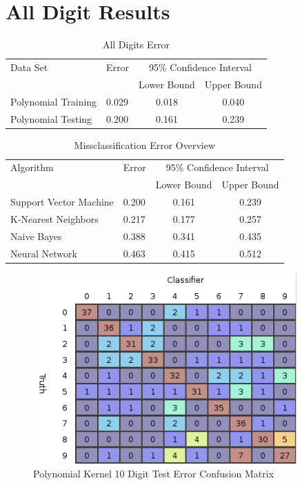 \documentclass{article}
\begin{document}
\section{All Digit Results}\label{ResultsAll}

\begin{table}
\caption{All Digits Error}
\begin{center}
\begin{tabular}{llcc}
\toprule
Data Set & Error & \multicolumn{2}{c}{95\% Confidence Interval} \\
\cmidrule(r){3-4}
& & Lower Bound & Upper Bound \\
\midrule
Polynomial Training & 0.029 & 0.018 & 0.040 \\
Polynomial Testing & 0.200 & 0.161 & 0.239 \\
\bottomrule
\end{tabular}
\label{error2}
\end{center}
\end{table}


\begin{table}
\caption{Missclassification Error Overview}
\begin{center}
\begin{tabular}{llcc}
\toprule
Algorithm & Error & \multicolumn{2}{c}{95\% Confidence Interval} \\
\cmidrule(r){3-4}
& & Lower Bound & Upper Bound \\
\midrule
Support Vector Machine & 0.200 & 0.161 & 0.239 \\
K-Nearest Neighbors & 0.217 & 0.177 & 0.257 \\
Naive Bayes & 0.388 &  0.341 & 0.435  \\
Neural Network & 0.463 &  0.415 & 0.512  \\
\bottomrule
\end{tabular}
\label{error3}
\end{center}
\end{table}


\begin{figure}
\centering
\includegraphics[width=0.9\textwidth]{images/poly_all_confusion_test.png}
\caption{Polynomial Kernel 10 Digit Test Error Confusion Matrix}
\label{poly10testconfusion}
\end{figure}
\end{document}
